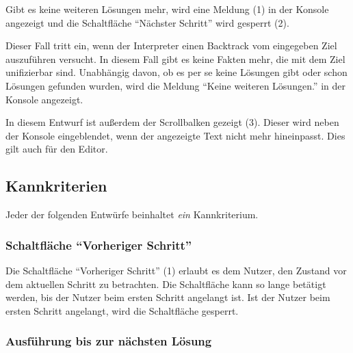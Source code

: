 \documentclass[parskip=full,11pt,twoside]{scrartcl}
\begin{document}
Gibt es keine weiteren Lösungen mehr, wird eine Meldung (1) in der Konsole angezeigt und die Schaltfläche \enquote{Nächster Schritt} wird gesperrt (2).

Dieser Fall tritt ein, wenn der Interpreter einen Backtrack vom eingegeben Ziel auszuführen versucht.
In diesem Fall gibt es keine Fakten mehr, die mit dem Ziel unifizierbar sind.
Unabhängig davon, ob es per se keine Lösungen gibt oder schon Lösungen gefunden wurden, wird die Meldung \enquote{Keine weiteren Lösungen.} in der Konsole angezeigt.

In diesem Entwurf ist außerdem der Scrollbalken gezeigt (3).
Dieser wird neben der Konsole eingeblendet, wenn der angezeigte Text nicht mehr hineinpasst.
Dies gilt auch für den Editor.

\subsection{Kannkriterien}

Jeder der folgenden Entwürfe beinhaltet \emph{ein} Kannkriterium.

\subsubsection{Schaltfläche \enquote{Vorheriger Schritt}}

\begin{minipage}{\linewidth}
\end{minipage}

\begin{minipage}{\linewidth}
\end{minipage}

Die Schaltfläche \enquote{Vorheriger Schritt} (1) erlaubt es dem Nutzer, den Zustand vor dem aktuellen Schritt zu betrachten.
Die Schaltfläche kann so lange betätigt werden, bis der Nutzer beim ersten Schritt angelangt ist.
Ist der Nutzer beim ersten Schritt angelangt, wird die Schaltfläche gesperrt.

\subsubsection{Ausführung bis zur nächsten Lösung}
\end{document}
